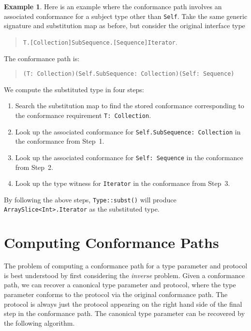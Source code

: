 \documentclass[a4paper,headsepline,bibliography=totoc,toc=flat,fleqn,twoside=semi]{scrbook}
\theoremstyle{definition}
\theoremstyle{definition}
\newtheorem{example}{Example}[chapter]
\theoremstyle{definition}
\begin{document}
\begin{example}
Here is an example where the conformance path involves an associated conformance for a subject type other than \texttt{Self}. Take the same generic signature and substitution map as before, but consider the original interface type
\begin{quote}
\texttt{T.[Collection]SubSequence.[Sequence]Iterator}.
\end{quote}
The conformance path is:
\begin{quote}
\texttt{(T:\ Collection)(Self.SubSequence:\ Collection)(Self:\ Sequence)}
\end{quote}

We compute the substituted type in four steps:
\begin{enumerate}
\item Search the substitution map to find the stored conformance corresponding to the conformance requirement \texttt{T:\ Collection}.
\item Look up the associated conformance for \texttt{Self.SubSequence:\ Collection} in the conformance from Step~1.
\item Look up the associated conformance for \texttt{Self:\ Sequence} in the conformance from Step~2.
\item Look up the type witness for \texttt{Iterator} in the conformance from Step~3.
\end{enumerate}
By following the above steps, \texttt{Type::subst()} will produce \texttt{ArraySlice<Int>.Iterator} as the substituted type.
\end{example}

\section{Computing Conformance Paths}\label{computing conformance paths}

The problem of computing a conformance path for a type parameter and protocol is best understood by first considering the \emph{inverse} problem. Given a conformance path, we can recover a canonical type parameter and protocol, where the type parameter conforms to the protocol via the original conformance path. The protocol is always just the protocol appearing on the right hand side of the final step in the conformance path. The canonical type parameter can be recovered by the following algorithm.
\end{document}
